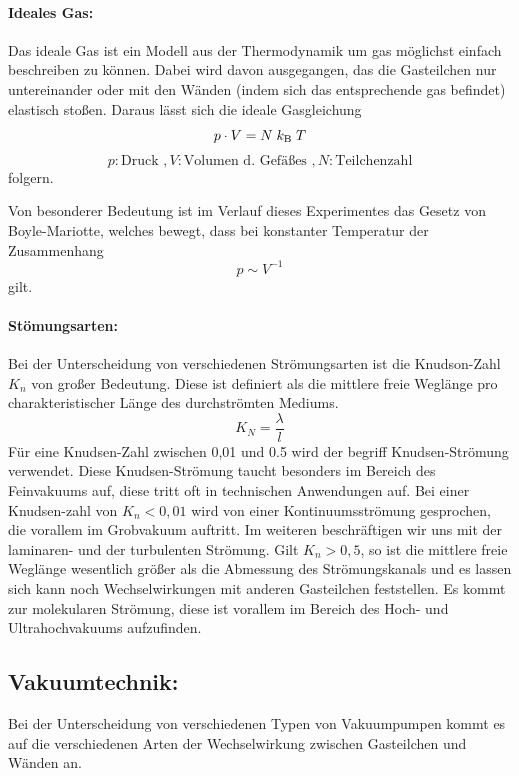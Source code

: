 \paragraph{Ideales Gas:}
Das ideale Gas ist ein Modell aus der Thermodynamik um gas möglichst einfach beschreiben zu
können. Dabei wird davon ausgegangen, das die Gasteilchen nur untereinander oder mit den Wänden
(indem sich das entsprechende gas befindet) elastisch stoßen. Daraus lässt sich die ideale Gasgleichung
\begin{equation}
  p \cdot V = N \;k_\text{B}\;T \\
  \label{eqn:ideal}
\end{equation}
\begin{equation*}
  p:\text{Druck }, V:\text{Volumen d. Gefäßes }, N:\text{Teilchenzahl}
\end{equation*}
folgern.

Von besonderer Bedeutung ist im Verlauf dieses Experimentes das Gesetz von Boyle-Mariotte, welches bewegt,
dass bei konstanter Temperatur der Zusammenhang
\begin{equation}
  p \sim V^{-1}
\end{equation}
gilt.

\paragraph{Stömungsarten:}
Bei der Unterscheidung von verschiedenen Strömungsarten ist die Knudson-Zahl $K_n$ von großer
Bedeutung. Diese ist definiert als die mittlere freie Weglänge pro charakteristischer Länge des
durchströmten Mediums.
\begin{equation}
  K_N = \frac{\lambda}{l}
  \label{eqn:Knudsen}
\end{equation}
Für eine Knudsen-Zahl zwischen 0,01 und 0.5 wird der begriff Knudsen-Strömung verwendet. Diese
Knudsen-Strömung taucht besonders im Bereich des Feinvakuums auf, diese tritt oft in technischen Anwendungen
auf.
Bei einer Knudsen-zahl von $K_n < 0,01$ wird von einer Kontinuumsströmung gesprochen, die vorallem im
Grobvakuum auftritt. Im weiteren beschräftigen wir uns mit der laminaren- und der turbulenten Strömung.
Gilt $K_n > 0,5$, so ist die mittlere freie Weglänge wesentlich größer als die Abmessung des Strömungskanals
und es lassen sich kann noch Wechselwirkungen mit anderen Gasteilchen feststellen. Es kommt zur molekularen
Strömung, diese ist vorallem im Bereich des Hoch- und Ultrahochvakuums aufzufinden.

\subsection{Vakuumtechnik:}
Bei der Unterscheidung von verschiedenen Typen von Vakuumpumpen kommt es auf die verschiedenen Arten der
Wechselwirkung zwischen Gasteilchen und Wänden an.

